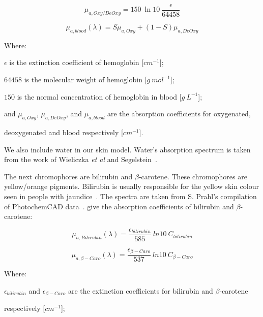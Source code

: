 \begin{equation}
\mu_{a,Oxy/DeOxy}=150\ \ln10\ \frac{\epsilon}{64458}
\label{eqn:oxy}
\end{equation}

\begin{equation}
\mu_{a,blood}(\lambda) = S\mu_{a,Oxy}+(1-S)\mu_{a,DeOxy}
\label{eqn:blood}
\end{equation}

\noindent Where:

\indent $\epsilon$ is the extinction coefficient of hemoglobin [$cm^{-1}$];

\indent $64458$ is the molecular weight of hemoglobin [$g\ mol^{-1}$];

\indent $150$ is the normal concentration of hemoglobin in blood [$g\ L^{-1}$];

\indent and $\mu_{a,Oxy}$, $\mu_{a,DeOxy}$, and $\mu_{a,blood}$ are the absorption coefficients for oxygenated, 

\indent deoxygenated and blood respectively [$cm^{-1}$].

\medskip

We also include water in our skin model.
Water's absorption spectrum is taken from the work of Wieliczka \textit{et al} and Segelstein~\cite{wieliczka1989wedge,segelstein1981complex}.

The next chromophores are bilirubin and $\beta$-carotene.
These chromophores are yellow/orange pigments. 
Bilirubin is usually responsible for the yellow skin colour seen in people with jaundice~\cite{jacques1997developing}.
The spectra are taken from S. Prahl's compilation of PhotochemCAD data~\cite{prahlcaro,prahlbili}.
 give the absorption coefficients of bilirubin and $\beta$-carotene:

\begin{equation}
\mu_{a,Bilirubin}(\lambda)=\frac{\epsilon_{bilirubin}}{585}\ ln10\ C_{bilirubin}
\label{eqn:bili}
\end{equation}

\begin{equation}
\mu_{a,\beta-Caro}(\lambda)=\frac{\epsilon_{\beta-Caro}}{537}\ ln10\ C_{\beta-Caro}
\label{eqn:caro}
\end{equation}

\noindent Where:

\indent $\epsilon_{bilirubin}$ and $\epsilon_{\beta-Caro}$ are the extinction coefficients for bilirubin and $\beta$-carotene 

\indent respectively [$cm^{-1}$];


